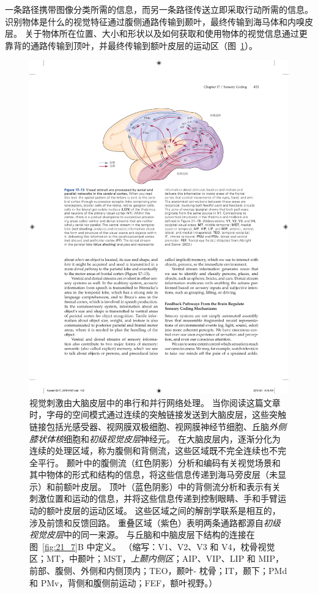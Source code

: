 一条路径携带图像分类所需的信息，而另一条路径传送立即采取行动所需的信息。 
识别物体是什么的视觉特征通过腹侧通路传输到颞叶，最终传输到海马体和内嗅皮层。 
关于物体所在位置、大小和形状以及如何获取和使用物体的视觉信息通过更靠背的通路传输到顶叶，并最终传输到额叶皮层的运动区（图~\ref{fig:17_13}）。


\begin{figure}[htbp]
	\centering
	\includegraphics[width=1.0\linewidth]{chap17/fig_17_13}
	\caption{视觉刺激由大脑皮层中的串行和并行网络处理。 
		当你阅读这篇文章时，字母的空间模式通过连续的突触链接发送到大脑皮层，这些突触链接包括光感受器、视网膜双极细胞、视网膜神经节细胞、丘脑\textit{外侧膝状体核}细胞和\textit{初级视觉皮层}神经元。 
		在大脑皮层内，逐渐分化为连续的处理区域，称为腹侧和背侧流，这些区域既不完全连续也不完全平行。 
		颞叶中的腹侧流（红色阴影）分析和编码有关视觉场景和其中物体的形式和结构的信息，将这些信息传递到海马旁皮层（未显示）和前额叶皮层。
		顶叶（蓝色阴影）中的背侧流分析和表示有关刺激位置和运动的信息，并将这些信息传递到控制眼睛、手和手臂运动的额叶皮层的运动区域。
		这些区域之间的解剖学联系是相互的，涉及前馈和反馈回路。
		重叠区域（紫色）表明两条通路都源自\textit{初级视觉皮层}中的同一来源。
		与丘脑和中脑皮层下结构的连接在图~\ref{fig:21_7}B 中定义。 （缩写：V1、V2、V3 和 V4，枕骨视觉区；MT，中颞叶；MST，\textit{上颞内侧区}；AIP、VIP、LIP 和 MIP，前部、腹侧、外侧和内侧顶内；TEO，颞叶- 枕骨；IT，颞下；PMd 和 PMv，背侧和腹侧前运动；FEF，额叶视野。）\cite{albright2002contextual}}
	\label{fig:17_13}
\end{figure}


